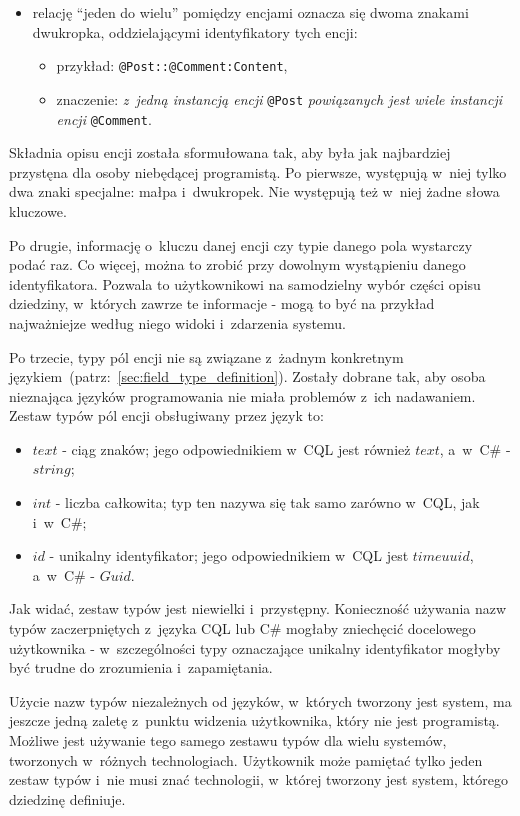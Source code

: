 \begin{itemize}
 \item relację ``jeden do wielu'' pomiędzy encjami oznacza się dwoma znakami dwukropka, oddzielającymi identyfikatory tych encji:
  \begin{itemize}
   \item przykład: \verb|@Post::@Comment:Content|,
   \item znaczenie: \emph{z~jedną instancją encji} \verb|@Post| \emph{powiązanych jest wiele instancji encji} \verb|@Comment|.
  \end{itemize}
\end{itemize}

Składnia opisu encji została sformułowana tak, aby była jak najbardziej przystęna dla osoby niebędącej programistą.
Po pierwsze, występują w~niej tylko dwa znaki specjalne: małpa i~dwukropek.
Nie występują też w~niej żadne słowa kluczowe.

Po drugie, informację o~kluczu danej encji czy typie danego pola wystarczy podać raz.
Co więcej, można to zrobić przy dowolnym wystąpieniu danego identyfikatora.
Pozwala to użytkownikowi na samodzielny wybór części opisu dziedziny, w~których zawrze te informacje - mogą to być na przykład najważniejze według niego widoki i~zdarzenia systemu.

Po trzecie, typy pól encji nie są związane z~żadnym konkretnym językiem~(patrz:~\ref{sec:field_type_definition}).
Zostały dobrane tak, aby osoba nieznająca języków programowania nie miała problemów z~ich nadawaniem.
Zestaw typów pól encji obsługiwany przez język to:

\begin{itemize}
 \item $text$ - ciąg znaków; jego odpowiednikiem w~CQL jest również $text$, a~w~C\# - $string$;
 \item $int$ - liczba całkowita; typ ten nazywa się tak samo zarówno w~CQL, jak i~w~C\#;
 \item $id$ - unikalny identyfikator; jego odpowiednikiem w~CQL jest $timeuuid$, a~w~C\# - $Guid$.
\end{itemize}

Jak widać, zestaw typów jest niewielki i~przystępny.
Konieczność używania nazw typów zaczerpniętych z~języka CQL lub C\# mogłaby zniechęcić docelowego użytkownika - w~szczególności typy oznaczające unikalny identyfikator mogłyby być trudne do zrozumienia i~zapamiętania.

Użycie nazw typów niezależnych od języków, w~których tworzony jest system, ma jeszcze jedną zaletę z~punktu widzenia użytkownika, który nie jest programistą.
Możliwe jest używanie tego samego zestawu typów dla wielu systemów, tworzonych w~różnych technologiach.
Użytkownik może pamiętać tylko jeden zestaw typów i~nie musi znać technologii, w~której tworzony jest system, którego dziedzinę definiuje.


